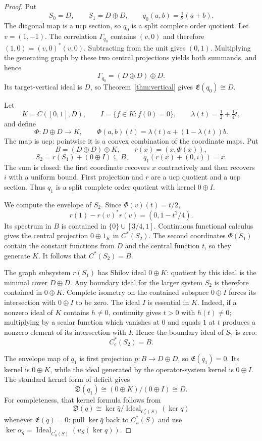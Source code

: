 \documentclass[11pt,a4paper]{amsart}
\theoremstyle{plain}
\theoremstyle{definition}
\newcommand{\Cu}{C_u^*}
\newcommand{\Ce}{C_e^*}
\newcommand{\Esc}{\mathfrak E}
\newcommand{\Def}{\mathfrak D}
\newcommand{\Ideal}{\operatorname{Ideal}}
\begin{document}
\begin{proof}
Put
\[
 S_0=D,\qquad S_1=D\oplus D,\qquad
 q_0(a,b)=\tfrac12(a+b).
\]
The diagonal map is a ucp section, so $q_0$ is a split complete order quotient.  Let
$v=(1,-1)$.  The correlation $\Gamma_{q_0}$ contains $(v,0)$ and therefore
$(1,0)=(v,0)^*(v,0)$.  Subtracting from the unit gives $(0,1)$.  Multiplying the generating
graph by these two central projections yields both summands, and hence
\[
 \Gamma_{q_0}=(D\oplus D)\oplus D.
\]
Its target-vertical ideal is $D$, so Theorem~\ref{thm:vertical} gives
$\Esc(q_0)\cong D$.

Let
\[
 K=C([0,1],D),\qquad I=\{f\in K:f(0)=0\},\qquad
 \lambda(t)=\tfrac12+\tfrac14t,
\]
and define
\[
 \Phi:D\oplus D\longrightarrow K,\qquad
 \Phi(a,b)(t)=\lambda(t)a+(1-\lambda(t))b.
\]
The map is ucp: pointwise it is a convex combination of the coordinate maps.  Put
\[
 B=(D\oplus D)\oplus K,\qquad r(x)=(x,\Phi(x)),
\]
\[
 S_2=r(S_1)+(0\oplus I)\subseteq B,\qquad
 q_1(r(x)+(0,i))=x.
\]
The sum is closed: the first coordinate recovers $x$ contractively and then recovers
$i$ with a uniform bound.  First projection and $r$ are a ucp quotient and a ucp section.
Thus $q_1$ is a split complete order quotient with kernel $0\oplus I$.

We compute the envelope of $S_2$.  Since $\Phi(v)(t)=t/2$,
\[
 r(1)-r(v)^*r(v)=(0,1-t^2/4).
\]
Its spectrum in $B$ is contained in $\{0\}\cup[3/4,1]$.  Continuous functional calculus gives
the central projection $0\oplus1_K$ in $C^*(S_2)$.  The second coordinates $\Phi(S_1)$ contain
the constant functions from $D$ and the central function $t$, so they generate $K$.  It follows
that $C^*(S_2)=B$.

The graph subsystem $r(S_1)$ has Shilov ideal $0\oplus K$: quotient by this ideal is the minimal
cover $D\oplus D$.  Any boundary ideal for the larger system $S_2$ is therefore contained in
$0\oplus K$.  Complete isometry on the contained subspace $0\oplus I$ forces its intersection
with $0\oplus I$ to be zero.  The ideal $I$ is essential in $K$.  Indeed, if a nonzero ideal of
$K$ contains $h\ne0$, continuity gives $t>0$ with $h(t)\ne0$; multiplying by a scalar function
which vanishes at $0$ and equals $1$ at $t$ produces a nonzero element of its intersection with
$I$.  Hence the boundary ideal of $S_2$ is zero:
\[
 \Ce(S_2)=B.
\]

The envelope map of $q_1$ is first projection $p:B\to D\oplus D$, so $\Esc(q_1)=0$.
Its kernel is $0\oplus K$, while the ideal generated by the operator-system kernel is
$0\oplus I$.  The standard kernel form of deficit gives
\[
 \Def(q_1)\cong(0\oplus K)/(0\oplus I)\cong D.
\]
For completeness, that kernel formula follows from
\[
 \Def(q)\cong
 \ker\bar q\big/\Ideal_{\Ce(S)}(\ker q)
\]
whenever $\Esc(q)=0$: pull $\ker\bar q$ back to $\Cu(S)$ and use
\(\ker\alpha_q=\Ideal_{\Cu(S)}(u_S(\ker q))\).


\end{proof}
\end{document}
